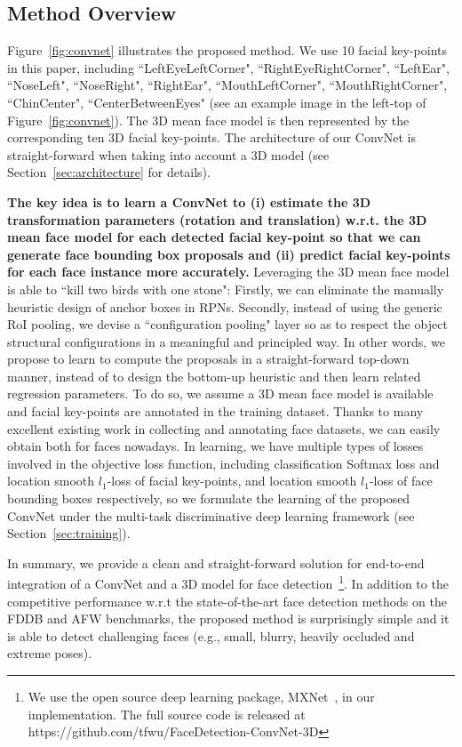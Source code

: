 \documentclass[runningheads]{llncs}
\begin{document}
\subsection{Method Overview}
Figure~\ref{fig:convnet} illustrates the proposed method. We use 10 facial key-points in this paper, including {``LeftEyeLeftCorner", ``RightEyeRightCorner",
    ``LeftEar", ``NoseLeft", ``NoseRight", ``RightEar",
    ``MouthLeftCorner",
    ``MouthRightCorner",
    ``ChinCenter",
    ``CenterBetweenEyes"} (see an example image in the left-top of Figure~\ref{fig:convnet}). The 3D mean face model is then represented by the corresponding ten 3D facial key-points. The architecture of our ConvNet is straight-forward when taking into account a 3D model (see Section~\ref{sec:architecture} for details).

 \textbf{The key idea is to learn a ConvNet to (i) estimate the 3D transformation parameters (rotation and translation) w.r.t. the 3D mean face model  for each detected facial key-point so that we can generate face bounding box proposals and (ii) predict facial key-points for each face instance more accurately.}  Leveraging the 3D mean face model is able to ``kill two birds with one stone": Firstly, we can eliminate the manually heuristic design of anchor boxes in RPNs. Secondly, instead of using the generic RoI pooling, we devise a ``configuration pooling" layer so as to respect the object structural configurations in a meaningful and principled way. In other words, we propose to learn to compute the proposals in a straight-forward top-down manner, instead of to design the bottom-up heuristic and then learn related regression parameters. To do so,  we assume a 3D mean face model is available and facial key-points are annotated in the training dataset. Thanks to  many excellent existing work in collecting and annotating face datasets, we can easily obtain both for faces nowadays.  In learning, we have multiple types of losses involved in the objective loss function, including classification Softmax loss and location smooth $l_1$-loss \cite{FastRCNN} of facial key-points, and location smooth $l_1$-loss of face bounding boxes respectively, so we formulate the learning of the proposed ConvNet under the multi-task discriminative deep learning framework (see Section~\ref{sec:training}).

In summary, we provide a clean and straight-forward solution for end-to-end integration of a ConvNet and a 3D model for face detection~\footnote{We use the open source deep learning package, MXNet~\cite{mxnet}, in our implementation. The full source code is released at https://github.com/tfwu/FaceDetection-ConvNet-3D}. In addition to the competitive performance w.r.t the state-of-the-art face detection methods on the FDDB and AFW benchmarks, the proposed method is surprisingly simple and it is able to detect challenging faces (e.g., small, blurry, heavily occluded and extreme poses).
\end{document}
